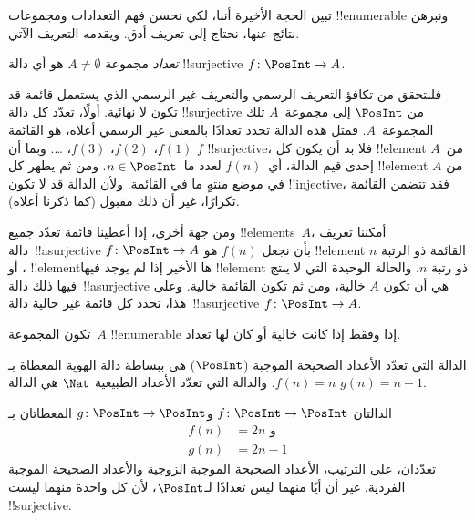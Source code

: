 \documentclass[../../../include/open-logic-section]{subfiles}
\begin{document}
تبين الحجة الأخيرة أننا، لكي نحسن فهم التعدادات ومجموعات
!!{enumerable} ونبرهن نتائج عنها، نحتاج إلى تعريف أدق. ويقدمه التعريف
الآتي.

\begin{defn}
\emph{تعداد} مجموعة $A \neq \emptyset$ هو أي دالة
!!{surjective} $f \colon \PosInt \to A$.
\end{defn}

\begin{explain}
فلنتحقق من تكافؤ التعريف الرسمي والتعريف غير الرسمي الذي يستعمل قائمة
قد تكون لا نهائية. أولًا، تعدّد كل دالة !!{surjective} من $\PosInt$
إلى مجموعة~$A$ تلك المجموعة~$A$. فمثل هذه الدالة تحدد تعدادًا بالمعنى
غير الرسمي أعلاه، هو القائمة $f(1)$، $f(2)$، $f(3)$، \dots. وبما أن
$f$ !!{surjective}، فلا بد أن يكون كل !!{element} من~$A$ إحدى
قيم الدالة، أي~$f(n)$ لعدد ما~$n \in \PosInt$. ومن ثم يظهر كل !!{element} من
$A$ في موضع منتهٍ ما في القائمة. ولأن الدالة قد لا تكون
!!{injective}، فقد تتضمن القائمة تكرارًا، غير أن ذلك مقبول (كما
ذكرنا أعلاه).

ومن جهة أخرى، إذا أعطينا قائمة تعدّد جميع !!{element}s~$A$،
أمكننا تعريف دالة~!!a{surjective} $f\colon \PosInt \to A$ بأن نجعل
$f(n)$ هو !!{element} القائمة ذو الرتبة $n$، أو !!{element}ها
الأخير إذا لم يوجد فيها !!{element} ذو رتبة $n$. والحالة الوحيدة التي
لا ينتج فيها ذلك دالة~!!a{surjective} هي أن تكون $A$ خالية، ومن ثم
تكون القائمة خالية. وعلى هذا، تحدد كل قائمة غير خالية
دالة~!!a{surjective} $f\colon \PosInt \to A$.
\end{explain}

\begin{defn}
  تكون المجموعة~$A$ !!{enumerable} إذا وفقط إذا كانت خالية أو كان
  لها تعداد.
\end{defn}

\begin{ex}
الدالة التي تعدّد الأعداد الصحيحة الموجبة ($\PosInt$) هي ببساطة دالة
الهوية المعطاة بـ$f(n) = n$. والدالة التي تعدّد الأعداد الطبيعية
$\Nat$ هي الدالة $g(n) = n - 1$.
\end{ex}

\begin{ex}
الدالتان $f\colon \PosInt \to \PosInt$ و$g \colon \PosInt \to
\PosInt$ المعطاتان بـ
\begin{align*}
f(n) & = 2n \text{ و}\\
g(n) & = 2n - 1
\end{align*}
تعدّدان، على الترتيب، الأعداد الصحيحة الموجبة الزوجية والأعداد الصحيحة
الموجبة الفردية. غير أن أيًا منهما ليس تعدادًا لـ$\PosInt$، لأن كل
واحدة منهما ليست !!{surjective}.
\end{ex}
\end{document}

